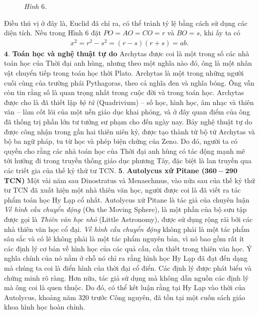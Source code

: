 \begin{multicols}{2}
\begin{figure}[H]
		\caption{\small\textit{\color{lichsutoanhoc}Hình $6$.}}
		\vspace*{-10pt}
	\end{figure}
	Điều thú vị ở đây là, Euclid đã chỉ ra, có thể tránh tỷ lệ bằng cách sử dụng các diện tích.
	\vskip 0.1cm
	Nếu trong Hình $6$ đặt $PO = AO = CO =r$  và $BO = s$,  khi ấy ta có 
	\begin{align*}
		x^2 = r^2 - s^2 = (r-s)(r+s) = ab.
	\end{align*}
	$\pmb{4.}$ \textbf{\color{lichsutoanhoc}Toán học và nghệ thuật tự do} 
	\vskip 0.1cm
	Archytas được coi là một trong số các nhà toán học của Thời đại anh hùng, nhưng theo một nghĩa nào đó, ông là một nhân vật chuyển tiếp trong toán học thời Plato. 
	\vskip 0.1cm
	Archytas là một trong những người cuối cùng của trường phái Pythagoras, theo cả nghĩa đen và nghĩa bóng. Ông vẫn còn tin rằng số là quan trọng nhất trong cuộc đời và trong toán học.
	\vskip 0.1cm 
	Archytas được cho là đã thiết lập \textit{bộ tứ} (Quadrivium) -- số học, hình học, âm nhạc và thiên văn -- làm cốt lõi của một nền giáo dục khai phóng, và ở đây quan điểm của ông đã thống trị phần lớn tư tưởng sư phạm cho đến ngày nay.
	\vskip 0.1cm
	Bảy nghệ thuật tự do được công nhận trong gần hai thiên niên kỷ, được tạo thành từ bộ tứ Archytas và bộ ba ngữ pháp, tu từ học và phép biện chứng của Zeno. Do đó, người ta có quyền cho rằng các nhà toán học của Thời đại anh hùng có tác động mạnh mẽ tới hướng đi trong truyền thống giáo dục phương Tây, đặc biệt là lan truyền qua các triết gia của thế kỷ thứ tư TCN.
	\vskip 0.1cm
	$\pmb{5.}$ \textbf{\color{lichsutoanhoc}Autolycus xứ Pitane ($\pmb{360-290}$ TCN)}
	\vskip 0.1cm
	Một vài năm sau Dinostratus và Menaechmus, vào nửa sau của thế kỷ thứ tư TCN đã xuất hiện một nhà thiên văn học, người được coi là đã viết ra tác phẩm toán học Hy Lạp cổ nhất. 
	\vskip 0.1cm
	Autolycus xứ Pitane là tác giả của chuyên luận \textit{Về hình cầu chuyển động} (On the Moving Sphere), là một phần của bộ sưu tập được gọi là \textit{Thiên văn học nhỏ} (Little Astronomy), được sử dụng rộng rãi bởi các nhà thiên văn học cổ đại. \textit{Về hình cầu chuyển động} không phải là một tác phẩm sâu sắc và có lẽ không phải là một tác phẩm nguyên bản, vì nó bao gồm rất ít các định lý cơ bản về hình học của các quả cầu, cần thiết trong thiên văn học. Ý nghĩa chính của nó nằm ở chỗ nó chỉ ra rằng hình học Hy Lạp đã đạt đến dạng mà chúng ta coi là điển hình của thời đại cổ điển. Các định lý được phát biểu và chứng minh rõ ràng. Hơn nữa, tác giả sử dụng mà không  dẫn nguồn các định lý mà ông coi là quen thuộc. Do đó, có thể kết luận rằng tại Hy Lạp vào thời của Autolycus, khoảng năm $320$ trước Công nguyên, đã tồn tại một cuốn sách giáo khoa hình học hoàn chỉnh. 

\end{multicols}
